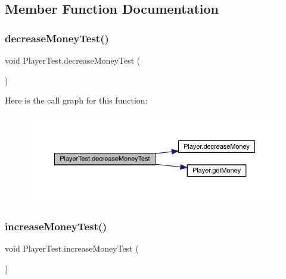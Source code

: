 \subsection{Member Function Documentation}
\mbox{\label{class_player_test_a08485efe7e74d67fa685f384ed735d02}} 
\subsubsection{\texorpdfstring{decrease\+Money\+Test()}{decreaseMoneyTest()}}
{\footnotesize\ttfamily void Player\+Test.\+decrease\+Money\+Test (\begin{DoxyParamCaption}{ }\end{DoxyParamCaption})\hspace{0.3cm}{\ttfamily [inline]}}

Here is the call graph for this function\+:
\nopagebreak
\begin{figure}[H]
\begin{center}
\leavevmode
\includegraphics[width=350pt]{class_player_test_a08485efe7e74d67fa685f384ed735d02_cgraph}
\end{center}
\end{figure}
\mbox{\label{class_player_test_a7e9437588b95b9b7cf2f34af9c594291}} 
\subsubsection{\texorpdfstring{increase\+Money\+Test()}{increaseMoneyTest()}}
{\footnotesize\ttfamily void Player\+Test.\+increase\+Money\+Test (\begin{DoxyParamCaption}{ }\end{DoxyParamCaption})\hspace{0.3cm}{\ttfamily [inline]}}

